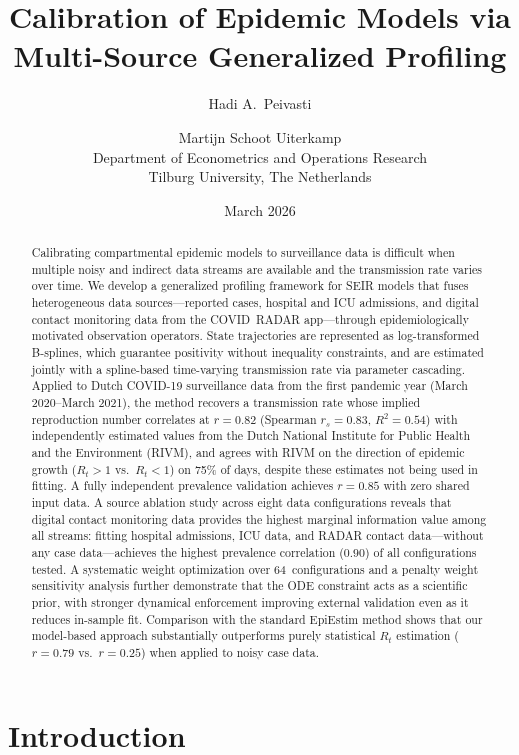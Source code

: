 \documentclass[11pt]{article}
\title{Calibration of Epidemic Models via Multi-Source Generalized Profiling}
\author{Hadi A.\ Peivasti \and Martijn Schoot Uiterkamp\\[4pt]
\small Department of Econometrics and Operations Research\\
\small Tilburg University, The Netherlands}
\date{March 2026}
\begin{document}
\maketitle

\begin{abstract}
Calibrating compartmental epidemic models to surveillance data is difficult when multiple noisy and indirect data streams are available and the transmission rate varies over time. We develop a generalized profiling framework for SEIR models that fuses heterogeneous data sources---reported cases, hospital and ICU admissions, and digital contact monitoring data from the COVID~RADAR app---through epidemiologically motivated observation operators. State trajectories are represented as log-transformed B-splines, which guarantee positivity without inequality constraints, and are estimated jointly with a spline-based time-varying transmission rate via parameter cascading. Applied to Dutch COVID-19 surveillance data from the first pandemic year (March 2020--March 2021), the method recovers a transmission rate whose implied reproduction number correlates at $r=0.82$ (Spearman $r_s=0.83$, $R^2=0.54$) with independently estimated values from the Dutch National Institute for Public Health and the Environment (RIVM), and agrees with RIVM on the direction of epidemic growth ($R_t>1$ vs.\ $R_t<1$) on 75\% of days, despite these estimates not being used in fitting. A fully independent prevalence validation achieves $r=0.85$ with zero shared input data. A source ablation study across eight data configurations reveals that digital contact monitoring data provides the highest marginal information value among all streams: fitting hospital admissions, ICU data, and RADAR contact data---without any case data---achieves the highest prevalence correlation ($0.90$) of all configurations tested. A systematic weight optimization over 64~configurations and a penalty weight sensitivity analysis further demonstrate that the ODE constraint acts as a scientific prior, with stronger dynamical enforcement improving external validation even as it reduces in-sample fit. Comparison with the standard EpiEstim method shows that our model-based approach substantially outperforms purely statistical $R_t$ estimation ($r=0.79$ vs.\ $r=0.25$) when applied to noisy case data.
\end{abstract}


\section{Introduction}\label{sec:intro}
\end{document}
